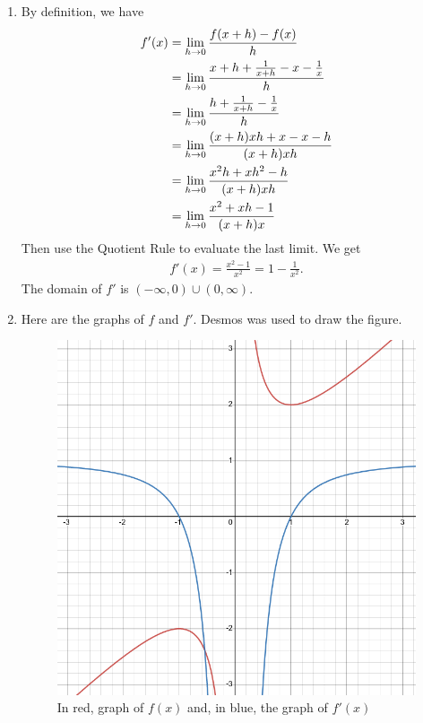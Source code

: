 	\spc
	
	\begin{enumerate}[label=(\alph*)]
	\item By definition, we have
		\begin{align*}
		f'(x) &= \lim_{h \rightarrow 0} \frac{f (x + h) - f(x)}{h} \\
		&= \lim_{h \rightarrow 0} \frac{x + h + \frac{1}{x + h} - x - \frac{1}{x}}{h} \\
		&= \lim_{h \rightarrow 0} \frac{h + \frac{1}{x+ h} - \frac{1}{x}}{h} \\
		&= \lim_{h \rightarrow 0} \frac{(x + h) xh + x - x - h}{(x + h) x h} \\
		&= \lim_{h \rightarrow 0} \frac{x^2 h + xh^2 - h}{(x + h) xh} \\
		&= \lim_{h \rightarrow 0} \frac{x^2 + xh - 1}{(x + h) x}
		\end{align*}
	Then use the Quotient Rule to evaluate the last limit. We get
		\begin{align*}
		f' (x) = \frac{x^2 - 1}{x^2} = 1 - \frac{1}{x^2} .
		\end{align*}
	The domain of $f'$ is $(-\infty , 0) \cup (0, \infty )$.
	\item Here are the graphs of $f$ and $f'$. Desmos was used to draw the figure.
		\begin{figure}[h]
		\centering
		\includegraphics[scale=0.4]{fig_1.png}
		\caption{In red, graph of $f(x)$ and, in blue, the graph of $f'(x)$}
		\end{figure}
	\end{enumerate}
	

